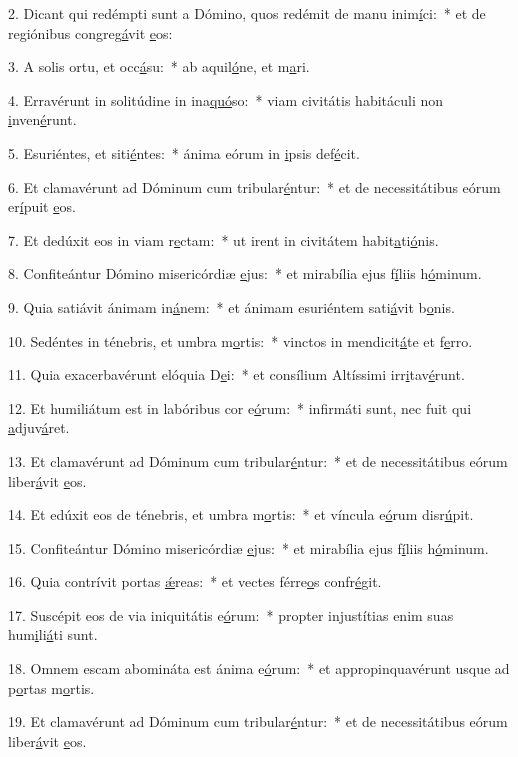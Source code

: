 2. Dicant qui redémpti sunt a Dómino, quos redémit de manu inim\uline{í}ci:~* et de regiónibus congreg\uline{á}vit \uline{e}os:\par 
3. A solis ortu, et occ\uline{á}su:~* ab aquil\uline{ó}ne, et m\uline{a}ri.\par 
4. Erravérunt in solitúdine in ina\uline{quó}so:~* viam civitátis habitáculi non \uline{i}nven\uline{é}runt.\par 
5. Esuriéntes, et siti\uline{é}ntes:~* ánima eórum in \uline{i}psis def\uline{é}cit.\par 
6. Et clamavérunt ad Dóminum cum tribular\uline{é}ntur:~* et de necessitátibus eórum er\uline{í}puit \uline{e}os.\par 
7. Et dedúxit eos in viam r\uline{e}ctam:~* ut irent in civitátem habit\uline{a}ti\uline{ó}nis.\par 
8. Confiteántur Dómino misericórdiæ \uline{e}jus:~* et mirabília ejus f\uline{í}liis h\uline{ó}minum.\par 
9. Quia satiávit ánimam in\uline{á}nem:~* et ánimam esuriéntem sati\uline{á}vit b\uline{o}nis.\par 
10. Sedéntes in ténebris, et umbra m\uline{o}rtis:~* vinctos in mendicit\uline{á}te et f\uline{e}rro.\par 
11. Quia exacerbavérunt elóquia D\uline{e}i:~* et consílium Altíssimi irr\uline{i}tav\uline{é}runt.\par 
12. Et humiliátum est in labóribus cor e\uline{ó}rum:~* infirmáti sunt, nec fuit qui \uline{a}djuv\uline{á}ret.\par 
13. Et clamavérunt ad Dóminum cum tribular\uline{é}ntur:~* et de necessitátibus eórum liber\uline{á}vit \uline{e}os.\par 
14. Et edúxit eos de ténebris, et umbra m\uline{o}rtis:~* et víncula e\uline{ó}rum disr\uline{ú}pit.\par 
15. Confiteántur Dómino misericórdiæ \uline{e}jus:~* et mirabília ejus f\uline{í}liis h\uline{ó}minum.\par 
16. Quia contrívit portas \uline{ǽ}reas:~* et vectes férre\uline{o}s confr\uline{é}git.\par 
17. Suscépit eos de via iniquitátis e\uline{ó}rum:~* propter injustítias enim suas hum\uline{i}li\uline{á}ti sunt.\par 
18. Omnem escam abomináta est ánima e\uline{ó}rum:~* et appropinquavérunt usque ad p\uline{o}rtas m\uline{o}rtis.\par 
19. Et clamavérunt ad Dóminum cum tribular\uline{é}ntur:~* et de necessitátibus eórum liber\uline{á}vit \uline{e}os.\par 
